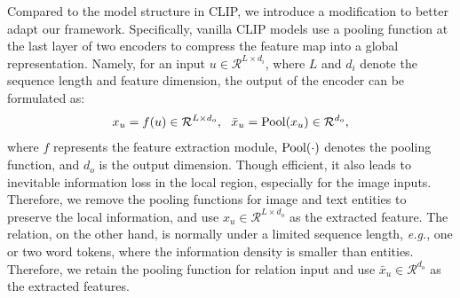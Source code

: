 Compared to the model structure in CLIP, we introduce a modification to better adapt our framework. Specifically, vanilla CLIP models use a pooling function at the last layer of two encoders to compress the feature map into a global representation. Namely, for an input $u \in \mathcal{R}^{L \times d_{i}}$, where $L$ and $d_{i}$ denote the sequence length and feature dimension, the output of the encoder can be formulated as:
\begin{equation}
    x_u = f(u) \in \mathcal{R}^{L \times d_o}, \ \ \bar{x}_u = {\rm Pool}(x_u) \in \mathcal{R}^{d_o},
\end{equation}
where $f$ represents the feature extraction module, ${\rm Pool}(\cdot)$ denotes the pooling function, and $d_o$ is the output dimension. Though efficient, it also leads to inevitable information loss in the local region, especially for the image inputs. Therefore, we remove the pooling functions for image and text entities to preserve the local information, and use $x_u \in \mathcal{R}^{L \times d_o}$ as the extracted feature. The relation, on the other hand, is normally under a limited sequence length, \textit{e.g.}, one or two word tokens, where the information density is smaller than entities. Therefore, we retain the pooling function for relation input and use $\bar{x}_u \in \mathcal{R}^{d_o}$ as the extracted features.

